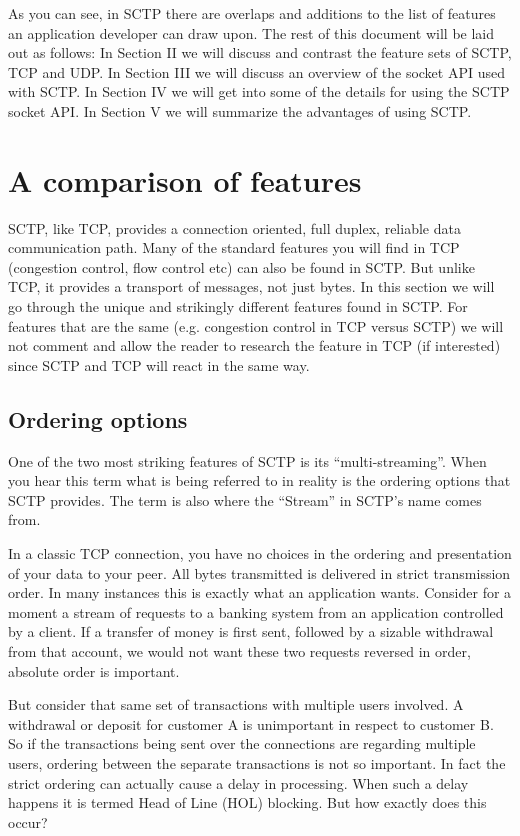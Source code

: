 \documentclass[conference]{IEEEtran}
\begin{document}
As you can see, in SCTP there are overlaps and additions to the list
of features an application developer can draw upon.  The rest of this document will be laid
out as follows: In Section II we will discuss and contrast the feature sets of SCTP, TCP and UDP.
In Section III we will discuss an overview of the socket API used with SCTP. In Section IV we will
get into some of the details for using the SCTP socket API. In Section V we will summarize the
advantages of using SCTP.

\section{A comparison of features}
SCTP, like TCP, provides a connection oriented, full duplex, reliable data communication path. 
Many of the standard features you will find in TCP (congestion control, flow control etc)
can also be found in SCTP. But unlike TCP, it provides a transport of messages, not just
bytes. In this section we will go through the unique and strikingly different
features found in SCTP. For features that are the same (e.g. congestion control in TCP versus
SCTP) we will not comment and allow the reader to research the feature
in TCP (if interested) since SCTP and TCP will react in the same way.

\subsection{Ordering options}
\label{hol}
One of the two most striking features of SCTP is its ``multi-streaming''. When you hear
this term what is being referred to in reality is the ordering options that SCTP provides.
The term is also where the ``Stream'' in SCTP's name comes from.

In a classic TCP connection, you have no choices in the ordering and presentation of your
data to your peer. All bytes transmitted is delivered in strict transmission order. In many
instances this is exactly what an application wants. Consider for a moment a stream of
requests to a banking system from an application controlled by a client. If a transfer of
money is first sent, followed by a sizable withdrawal from that account, we would not want
these two requests reversed in order, absolute order is important. 

But consider that same set of transactions with multiple users involved. A withdrawal or
deposit for customer A is unimportant in respect to customer B.  So if the transactions
being sent over the connections are regarding multiple users, ordering between the
separate transactions is not so important. In fact the strict ordering can actually cause
a delay in processing.  When such a delay happens it is termed Head of Line (HOL) blocking.
But how exactly does this occur?
\end{document}
